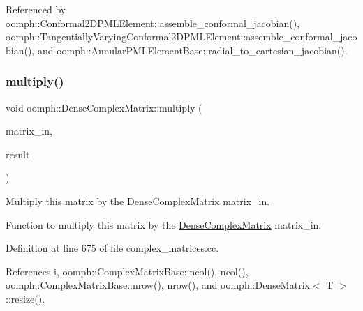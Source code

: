 Referenced by oomph\+::\+Conformal2\+D\+P\+M\+L\+Element\+::assemble\+\_\+conformal\+\_\+jacobian(), oomph\+::\+Tangentially\+Varying\+Conformal2\+D\+P\+M\+L\+Element\+::assemble\+\_\+conformal\+\_\+jacobian(), and oomph\+::\+Annular\+P\+M\+L\+Element\+Base\+::radial\+\_\+to\+\_\+cartesian\+\_\+jacobian().

\mbox{\label{classoomph_1_1DenseComplexMatrix_a2a7c992b599aeb9d43fda7f1ef63adaf}} 
\subsubsection{\texorpdfstring{multiply()}{multiply()}\hspace{0.1cm}{\footnotesize\ttfamily [2/2]}}
{\footnotesize\ttfamily void oomph\+::\+Dense\+Complex\+Matrix\+::multiply (\begin{DoxyParamCaption}\item[{const \hyperlink{classoomph_1_1DenseComplexMatrix}{Dense\+Complex\+Matrix} \&}]{matrix\+\_\+in,  }\item[{\hyperlink{classoomph_1_1DenseComplexMatrix}{Dense\+Complex\+Matrix} \&}]{result }\end{DoxyParamCaption})}



Multiply this matrix by the \hyperlink{classoomph_1_1DenseComplexMatrix}{Dense\+Complex\+Matrix} matrix\+\_\+in. 

Function to multiply this matrix by the \hyperlink{classoomph_1_1DenseComplexMatrix}{Dense\+Complex\+Matrix} matrix\+\_\+in. 

Definition at line 675 of file complex\+\_\+matrices.\+cc.



References i, oomph\+::\+Complex\+Matrix\+Base\+::ncol(), ncol(), oomph\+::\+Complex\+Matrix\+Base\+::nrow(), nrow(), and oomph\+::\+Dense\+Matrix$<$ T $>$\+::resize().

\mbox{\label{classoomph_1_1DenseComplexMatrix_aaaf8f0589e011bf720791058711fa952}} 
